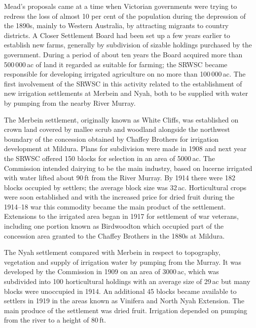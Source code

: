 Mead's proposals came at a time when Victorian governments were trying
to redress the loss of almost 10 per cent of the population during the
depression of the 1890s, mainly to Western Australia, by attracting
migrants to country districts.  A Closer Settlement Board had been set up a few years
earlier to establish new farms, generally by subdivision of sizable
holdings purchased by the government.  During a period of about ten
years the Board acquired more than 500\,000\,ac of land it regarded as
suitable for farming; the SRWSC became responsible for developing
irrigated agriculture on no more than 100\,000\,ac.  The first
involvement of the SRWSC in this activity related to the establishment
of new irrigation settlements at Merbein and Nyah, both to be supplied
with water by pumping from the nearby River Murray.

The Merbein settlement, originally known as White Cliffs, was
established on crown land covered by mallee scrub and woodland
alongside the northwest boundary of the concession obtained by Chaffey
Brothers for irrigation development at Mildura.  Plans for subdivision
were made in 1908 and next year the SRWSC offered 150 blocks for
selection in an area of 5000\,ac.  The Commission intended dairying to be the main industry,
based on lucerne irrigated with water lifted about 90\,ft from the
River Murray.  By 1914 there were 182 blocks occupied by settlers; the
average block size was 32\,ac. Horticultural crops were soon established and with the
increased price for dried fruit during the 1914--18 war this commodity
became the main product of the settlement.  Extensions to the
irrigated area began in 1917 for settlement of war veterans, including
one portion known as Birdwoodton which occupied part of the concession
area granted to the Chaffey Brothers in the 1880s at
Mildura.

The Nyah settlement compared with Merbein in respect to topography,
vegetation and supply of irrigation water by pumping from the Murray.
It was developed by the Commission in 1909 on an area of 3000\,ac,
which was subdivided into 100 horticultural holdings with an average
size of 29\,ac but many blocks were unoccupied in 1914.  An additional 45 blocks became available to settlers in 1919
in the areas known as Vinifera and North Nyah Extension.  The main
produce of the settlement was dried fruit.  Irrigation depended on
pumping from the river to a height of 80\,ft.

